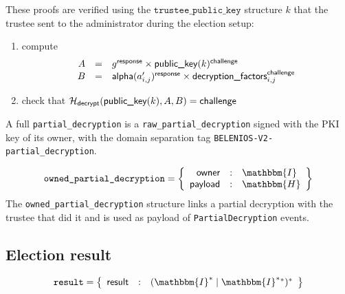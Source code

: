 \documentclass[a4paper]{article}
\newcommand{\dstprefix}{BELENIOS-V2}
\newcommand{\hash}{\mathbbm{H}}
\newcommand{\I}{\mathbbm{I}}
\newcommand{\tpk}{\texttt{trustee\_public\_key}}
\newcommand{\result}{\texttt{result}}
\begin{document}
These proofs are verified using the $\tpk$ structure $k$ that the
trustee sent to the administrator during the election setup:
\begin{enumerate}
\item compute
\[
\begin{array}{rcl}
A&=&{g^{\textsf{response}}}\times{\textsf{public\_key}(k)^{\textsf{challenge}}}\\
B&=&{\textsf{alpha}(a'_{i,j})^{\textsf{response}}}\times{\textsf{decryption\_factors}_{i,j}^{\textsf{challenge}}}
\end{array}
\]
\item check that $\mathcal{H}_{\textsf{decrypt}}(\textsf{public\_key}(k),A,B)=\textsf{challenge}$
\end{enumerate}

A full \texttt{partial\_decryption} is a
\texttt{raw\_partial\_decryption} signed with the PKI key of its
owner, with the domain separation tag
\texttt{\dstprefix-partial\_decryption}.

\begin{gather*}
  \texttt{owned\_partial\_decryption}=\left\{
    \begin{array}{rcl}
      \textsf{owner}&:&\I\\
      \textsf{payload}&:&\hash
    \end{array}
  \right\}
\end{gather*}
The \texttt{owned\_partial\_decryption} structure links a partial
decryption with the trustee that did it and is used as payload of
\texttt{PartialDecryption} events.

\subsection{Election result}
\label{election-result}

\newcommand{\ntallied}{\textsf{num\_tallied}}
\newcommand{\etallylabel}{\textsf{encrypted\_tally}}
\newcommand{\pdlabel}{\textsf{partial\_decryptions}}
\newcommand{\resultlabel}{\textsf{result}}

\begin{gather*}
  \result=\left\{
    \begin{array}{rcl}
      \resultlabel&:&(\I^\ast\mid\I^\ast{}^\ast)^\ast
    \end{array}
  \right\}
\end{gather*}
\end{document}
